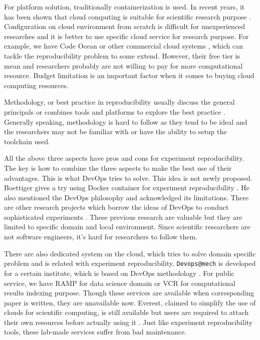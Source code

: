 \documentclass{IEEEcsmag}
\begin{document}
For platform solution, traditionally containerization is used. In recent years, it has been shown that cloud computing is suitable for scientific research purpose \cite{Howe12}. Configuration on cloud environment from scratch is difficult for unexperienced researches and it is better to use specific cloud service for research purpose. For example, we have Code Ocean or other commercial cloud systems \cite{perkel2018data}, which can tackle the reproducibility problem to some extend. However, their free tier is mean and researchers probably are not willing to pay for more computational resource. Budget limitation is an important factor when it comes to buying cloud computing resources.

Methodology, or best practice in reproducibility usually discuss the general principals \cite{stodden2014best} or combines tools and platforms to explore the best practice \cite{QashaCW16}. Generally speaking, methodology is hard to follow as they tend to be ideal and the researchers may not be familiar with or have the ability to setup the toolchain used.  

All the above three aspects have pros and cons for experiment reproducibility. The key is how to combine the three aspects to make the best use of their advantages. This is what DevOps tries to solve. This idea is not newly proposed. Boettiger gives a try using Docker container for experiment reproducibility \cite{Boettiger15}.
He also mentioned the DevOps philosophy and acknowledged its limitations.
There are other research projects which borrow the ideas of DevOps to conduct sophisticated experiments \cite{chwalisz2019walker}. These previous research are valuable but they are limited to specific domain and local environment. Since scientific researchers are not software engineers, it's hard for researchers to follow them. 

There are also dedicated system on the cloud, which tries to solve domain specific problem and is related with experiment reproducibility. \texttt{Devops@mech} is developed for a certain institute, which is based on DevOps methodology \cite{philips2019devops}. For public service, we have    RAMP for data science domain \cite{kegl2018ramp} or VCR for computational results indexing purpose\cite{GavishD12}. Though these services are available when corresponding paper is written, they are unavailable now.
Everest, claimed to simplify the use of clouds for scientific computing, is still available but users are required to attach their own resources before actually using it \cite{VOLKOV2017112}.
Just like experiment reproducibility tools, these lab-made services suffer from bad maintenance.
\end{document}

